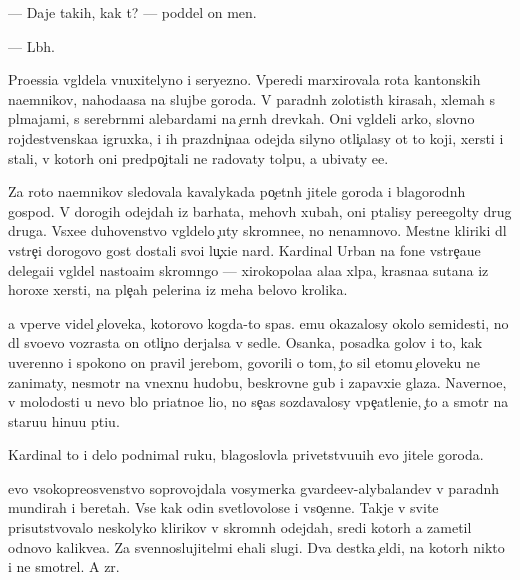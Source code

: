 \documentclass[10pt]{book}
\begin{document}
— Daje takih, kak t{\yi}? — poddel on men{\ia}.

— L{\iu}b{\yi}h.

Pro{\q}essi{\y}a v{\yi}gl{\ia}dela vnuxitelyno i seryezno. Vperedi marxirovala rota kantonskih na{\y}emnikov, nahod{\ia}{\x}a{\y}asa na slujbe goroda. V paradn{\yi}h zolotist{\yi}h kirasah, xlemah s pl{\iu}majami, s serebr{\ia}n{\yi}mi alebardami na {\c}ern{\yi}h drevkah. Oni v{\yi}gl{\ia}deli {\y}arko, slovno rojdestvenska{\y}a igruxka, i ih prazdni{\c}na{\y}a odejda silyno otli{\c}alasy ot to{\y} koji, xersti i stali, v kotor{\yi}h oni predpo{\c}itali ne radovaty tolpu, a ubivaty {\y}e{\y}e.

Za roto{\y} na{\y}emnikov sledovala kavalykada po{\c}etn{\yi}h jitele{\y} goroda i blagorodn{\yi}h gospod. V dorogih odejdah iz barhata, mehov{\yi}h xubah, oni p{\yi}talisy pere{\x}egol{\ia}ty drug druga. V{\yi}sxe{\y}e duhovenstvo v{\yi}gl{\ia}delo {\c}uty skromne{\y}e, no nenamnovo. Mestn{\yi}{\y}e kliriki dl{\ia} vstre{\c}i dorogovo gost{\ia} dostali svo{\y}i lu{\c}xi{\y}e nar{\ia}d{\yi}. Kardinal Urban na fone vstre{\c}a{\y}u{\x}e{\y} delega{\q}i{\y}i v{\yi}gl{\ia}del nasto{\y}a{\x}im skromn{\ia}go{\y} — xirokopola{\y}a ala{\y}a xl{\ia}pa, krasna{\y}a sutana iz horoxe{\y} xersti, na ple{\c}ah pelerina iz meha belovo krolika.

{\Y}a vperv{\yi}{\y}e videl {\c}eloveka, kotorovo kogda-to spas. {\Y}emu okazalosy okolo semides{\ia}ti, no dl{\ia} svo{\y}evo vozrasta on otli{\c}no derjalsa v sedle. Osanka, posadka golov{\yi} i to, kak uverenno i spoko{\y}no on pravil jereb{\q}om, govorili o tom, {\c}to sil etomu {\c}eloveku ne zanimaty, nesmotr{\ia} na vnexn{\iu}{\y}u hudobu, beskrovn{\yi}{\y}e gub{\yi} i zapavxi{\y}e glaza. Naverno{\y}e, v molodosti u nevo b{\yi}lo pri{\y}atno{\y}e li{\q}o, no se{\y}{\c}as sozdavalosy vpe{\c}atleni{\y}e, {\c}to {\y}a smotr{\iu} na staru{\y}u hi{\x}nu{\y}u pti{\q}u.

Kardinal to i delo podnimal ruku, blagoslovl{\ia}{\y}a privetstvu{\y}u{\x}ih {\y}evo jitele{\y} goroda.

{\Y}evo v{\yi}sokopreosv{\ia}{\x}enstvo soprovojdala vosymerka gvarde{\y}{\q}ev-alybaland{\q}ev v paradn{\yi}h mundirah i beretah. Vse kak odin svetlovolos{\yi}{\y}e i v{\yi}so{\c}enn{\yi}{\y}e. Takje v svite prisutstvovalo neskolyko klirikov v skromn{\yi}h odejdah, sredi kotor{\yi}h {\y}a zametil odnovo kalikve{\q}a. Za sv{\ia}{\x}ennoslujitel{\ia}mi {\y}ehali slugi. Dva des{\ia}tka {\c}el{\ia}di, na kotor{\yi}h nikto i ne smotrel. A zr{\ia}.
\end{document}
